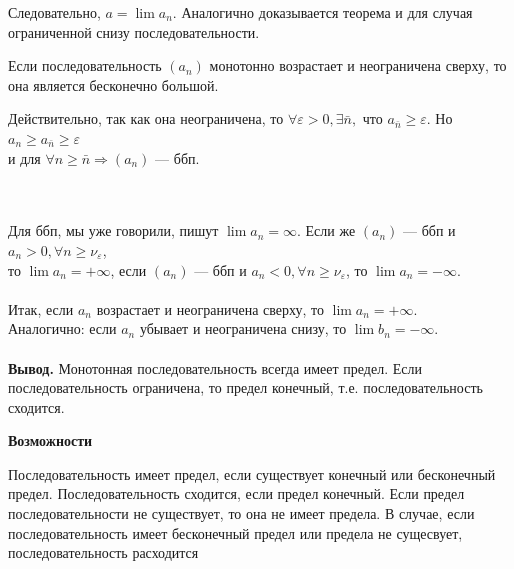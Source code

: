 Следовательно, $a=\lim a_n$. Аналогично доказывается теорема и для случая ограниченной снизу последовательности.
\begin{theorem}
	Если последовательность $(a_n)$ монотонно возрастает и неограничена сверху, то она является бесконечно большой.
\end{theorem}
\begin{Proof}
	Действительно, так как она неограничена, то $\forall\varepsilon > 0,\exists\bar n ,$ что $a_{\bar n}\geqslant\varepsilon$. Но $a_n \geqslant a_{\bar n}\geqslant\varepsilon$\\
	и для $\forall n \geqslant \bar n \Rightarrow (a_n)$ --- ббп.
\end{Proof}\\\\
Для ббп, мы уже говорили, пишут $\lim a_n = \infty$. Если же $(a_n)$ --- ббп и $a_n>0,\forall n \geqslant \nu_\varepsilon$,\\
то $\lim a_n = +\infty$, если $(a_n)$ --- ббп и $a_n < 0,\forall n \geqslant \nu_\varepsilon$, то $\lim a_n = -\infty$.\\\\
Итак, если $a_n$ возрастает и неограничена сверху, то $\lim a_n = +\infty$.\\
Аналогично: если $a_n$ убывает и неограничена снизу, то $\lim b_n = -\infty$.\\\\
\textbf{Вывод.} Монотонная последовательность всегда имеет предел. Если последовательность ограничена, то предел конечный, т.е. последовательность сходится.
\begin{center}
	\textbf{Возможности}
\end{center}
Последовательность имеет предел, если существует конечный или бесконечный предел. Последовательность сходится, если предел конечный. Если предел последовательности не существует, то она не имеет предела. В случае, если последовательность имеет бесконечный предел или предела не сущесвует, последовательность расходится
